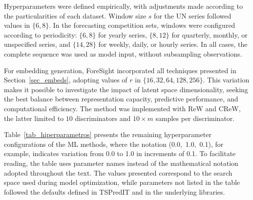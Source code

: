 \documentclass[final,3p,times,twocolumn,authoryear]{elsarticle}
\begin{document}
Hyperparameters were defined empirically, with adjustments made according to the particularities of each dataset. Window size $s$ for the UN series followed values in $\{6, 8\}$. In the forecasting competition sets, windows were configured according to periodicity: $\{6, 8\}$ for yearly series, $\{8, 12\}$ for quarterly, monthly, or unspecified series, and $\{14, 28\}$ for weekly, daily, or hourly series. In all cases, the complete sequence was used as model input, without subsampling observations.

For embedding generation, ForeSight incorporated all techniques presented in Section~\ref{sec_embeds}, adopting values of $r$ in $\{16, 32, 64, 128, 256\}$. This variation makes it possible to investigate the impact of latent space dimensionality, seeking the best balance between representation capacity, predictive performance, and computational efficiency. The method was implemented with ReW and CReW, the latter limited to $10$ discriminators and $10 \times m$ samples per discriminator.

Table~\ref{tab_hiperparametros} presents the remaining hyperparameter configurations of the ML methods, where the notation (\mbox{0.0, 1.0, 0.1}), for example, indicates variation from 0.0 to 1.0 in increments of 0.1. To facilitate reading, the table uses parameter names instead of the mathematical notation adopted throughout the text. The values presented correspond to the search space used during model optimization, while parameters not listed in the table followed the defaults defined in TSPredIT and in the underlying libraries.
\end{document}
